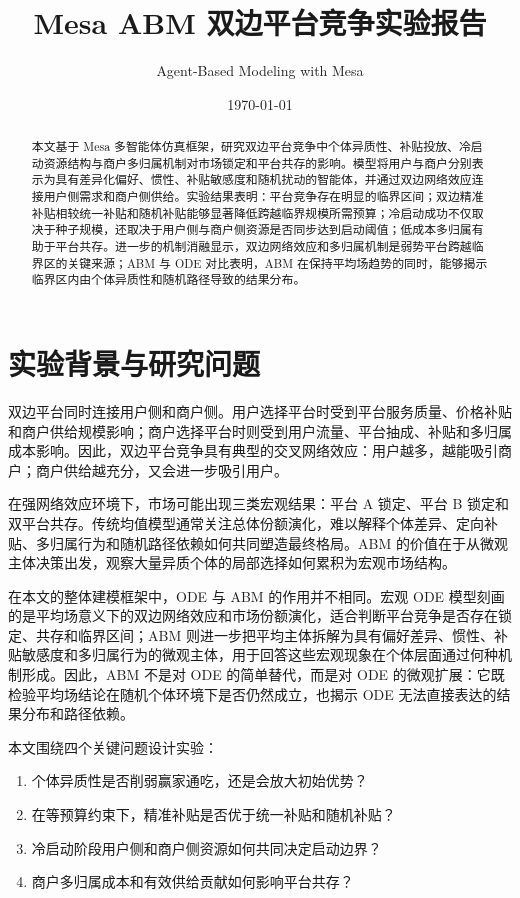 ﻿\documentclass[UTF8,zihao=-4]{ctexart}
\title{\bfseries Mesa ABM 双边平台竞争实验报告}
\author{Agent-Based Modeling with Mesa}
\date{\today}
\begin{document}
\maketitle

\begin{abstract}
本文基于 Mesa 多智能体仿真框架，研究双边平台竞争中个体异质性、补贴投放、冷启动资源结构与商户多归属机制对市场锁定和平台共存的影响。模型将用户与商户分别表示为具有差异化偏好、惯性、补贴敏感度和随机扰动的智能体，并通过双边网络效应连接用户侧需求和商户侧供给。实验结果表明：平台竞争存在明显的临界区间；双边精准补贴相较统一补贴和随机补贴能够显著降低跨越临界规模所需预算；冷启动成功不仅取决于种子规模，还取决于用户侧与商户侧资源是否同步达到启动阈值；低成本多归属有助于平台共存。进一步的机制消融显示，双边网络效应和多归属机制是弱势平台跨越临界区的关键来源；ABM 与 ODE 对比表明，ABM 在保持平均场趋势的同时，能够揭示临界区内由个体异质性和随机路径导致的结果分布。
\end{abstract}

\section{实验背景与研究问题}

双边平台同时连接用户侧和商户侧。用户选择平台时受到平台服务质量、价格补贴和商户供给规模影响；商户选择平台时则受到用户流量、平台抽成、补贴和多归属成本影响。因此，双边平台竞争具有典型的交叉网络效应：用户越多，越能吸引商户；商户供给越充分，又会进一步吸引用户。

在强网络效应环境下，市场可能出现三类宏观结果：平台 A 锁定、平台 B 锁定和双平台共存。传统均值模型通常关注总体份额演化，难以解释个体差异、定向补贴、多归属行为和随机路径依赖如何共同塑造最终格局。ABM 的价值在于从微观主体决策出发，观察大量异质个体的局部选择如何累积为宏观市场结构。

在本文的整体建模框架中，ODE 与 ABM 的作用并不相同。宏观 ODE 模型刻画的是平均场意义下的双边网络效应和市场份额演化，适合判断平台竞争是否存在锁定、共存和临界区间；ABM 则进一步把平均主体拆解为具有偏好差异、惯性、补贴敏感度和多归属行为的微观主体，用于回答这些宏观现象在个体层面通过何种机制形成。因此，ABM 不是对 ODE 的简单替代，而是对 ODE 的微观扩展：它既检验平均场结论在随机个体环境下是否仍然成立，也揭示 ODE 无法直接表达的结果分布和路径依赖。

本文围绕四个关键问题设计实验：

\begin{enumerate}
  \item 个体异质性是否削弱赢家通吃，还是会放大初始优势？
  \item 在等预算约束下，精准补贴是否优于统一补贴和随机补贴？
  \item 冷启动阶段用户侧和商户侧资源如何共同决定启动边界？
  \item 商户多归属成本和有效供给贡献如何影响平台共存？
\end{enumerate}
\end{document}
